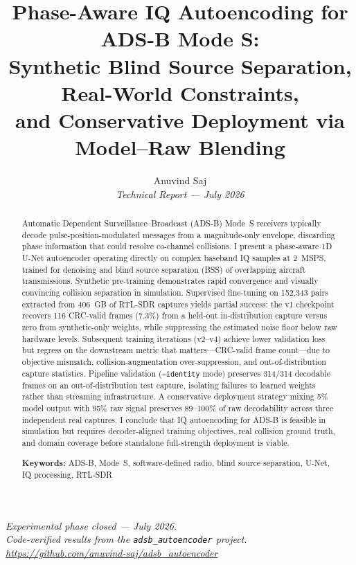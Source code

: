 \documentclass[11pt,a4paper]{article}
\title{%
  Phase-Aware IQ Autoencoding for ADS-B Mode S:\\
  Synthetic Blind Source Separation, Real-World Constraints,\\
  and Conservative Deployment via Model--Raw Blending
}
\author{%
  {\large Anuvind Saj}\\[0.75em]
  \textit{Technical Report --- July 2026}
}
\date{}
\begin{document}
\maketitle

\begin{center}
  \small\itshape
  Experimental phase closed --- July 2026.\\[0.25em]
  Code-verified results from the \texttt{adsb\_autoencoder} project.\\[0.25em]
  \url{https://github.com/anuvind-saj/adsb_autoencoder}
\end{center}
\vspace{1em}

\begin{abstract}
Automatic Dependent Surveillance--Broadcast (ADS-B) Mode~S receivers typically
decode pulse-position-modulated messages from a magnitude-only envelope,
discarding phase information that could resolve co-channel collisions. I
present a phase-aware 1D U-Net autoencoder operating directly on complex
baseband IQ samples at 2~MSPS, trained for denoising and blind source
separation (BSS) of overlapping aircraft transmissions. Synthetic pre-training
demonstrates rapid convergence and visually convincing collision separation in
simulation. Supervised fine-tuning on 152{,}343 pairs extracted from 406~GB of
RTL-SDR captures yields partial success: the v1 checkpoint recovers 116
CRC-valid frames (7.3\%) from a held-out in-distribution capture versus zero
from synthetic-only weights, while suppressing the estimated noise floor below
raw hardware levels. Subsequent training iterations (v2--v4) achieve lower
validation loss but regress on the downstream metric that matters---CRC-valid
frame count---due to objective mismatch, collision-augmentation
over-suppression, and out-of-distribution capture statistics. Pipeline
validation (\texttt{--identity} mode) preserves 314/314 decodable frames on an
out-of-distribution test capture, isolating failures to learned weights rather
than streaming infrastructure. A conservative deployment strategy mixing 5\%
model output with 95\% raw signal preserves 89--100\% of raw decodability
across three independent real captures. I conclude that IQ autoencoding for
ADS-B is feasible in simulation but requires decoder-aligned training
objectives, real collision ground truth, and domain coverage before
standalone full-strength deployment is viable.

\medskip
\noindent\textbf{Keywords:} ADS-B, Mode~S, software-defined radio, blind source
separation, U-Net, IQ processing, RTL-SDR
\end{abstract}
\end{document}
